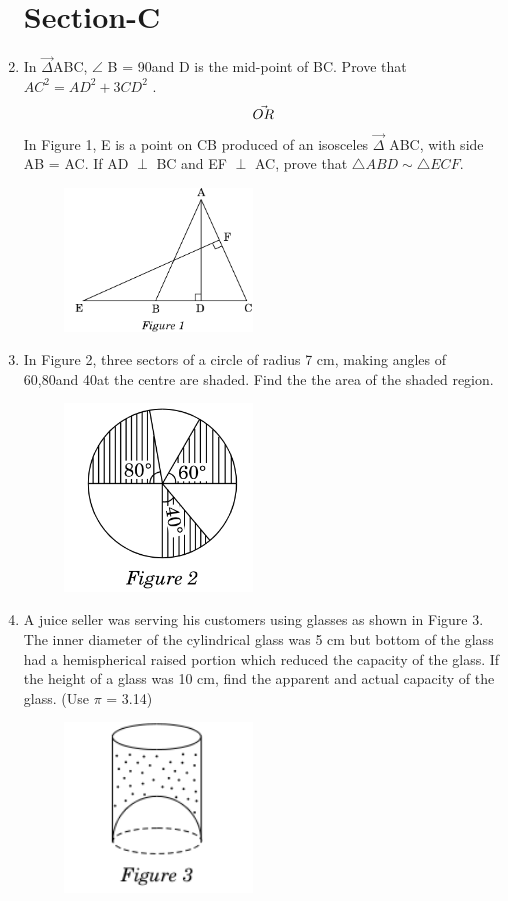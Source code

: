\documentclass[journal,12pt,twocolumn]{IEEEtran}
\begin{document}
\begin{enumerate}
\section{Section-C}
\item In $\vec{\Delta}$ABC, $\angle$ B = 90\textdegree\;and D is the mid-point of BC. Prove that
$AC^2 = AD^2 + 3CD^2$ .
\begin{align}
    \centering \vec{OR}\nonumber
\end{align}
In Figure 1, E is a point on CB produced of an isosceles $\vec{\Delta}$ ABC, with side
AB = AC. If AD $\perp$ BC and EF $\perp$ AC, prove that $\triangle ABD \sim \triangle ECF$.
\begin{figure}[h!]
    \centering
    \includegraphics[width=5cm]{1.png}
 \end{figure}
 \item In Figure 2, three sectors of a circle of radius 7 cm, making angles of 60\textdegree,80\textdegree and 40\textdegree at the centre are shaded. Find the the area of the shaded region.
 \begin{figure}[h!]
    \centering
    \includegraphics[width=5cm]{2.png}
 \end{figure}
 \item A juice seller was serving his customers using glasses as shown in Figure 3. The inner diameter of the cylindrical glass was 5 cm but bottom of the glass had a hemispherical raised portion which reduced the capacity of the glass. If the height of a glass was 10 cm, find the apparent and actual capacity of the glass. (Use $\pi$ = 3.14)
  \begin{figure}[h!]
    \centering
    \includegraphics[width=5cm]{3.png}

\end{figure}
\end{enumerate}
\end{document}
